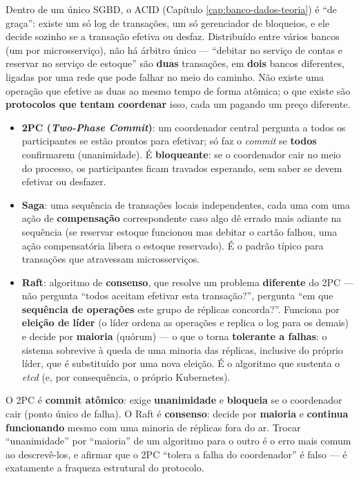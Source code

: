 \begin{conceito}
Dentro de um único SGBD, o ACID (Capítulo \ref{cap:banco-dados-teoria}) é
“de graça”: existe um só log de transações, um só gerenciador de
bloqueios, e ele decide sozinho se a transação efetiva ou desfaz.
Distribuído entre vários bancos (um por microsserviço), não há árbitro
único --- “debitar no serviço de contas e reservar no serviço de estoque”
são \textbf{duas} transações, em \textbf{dois} bancos diferentes, ligadas
por uma rede que pode falhar no meio do caminho. Não existe uma operação
que efetive as duas ao mesmo tempo de forma atômica; o que existe são
\textbf{protocolos que tentam coordenar} isso, cada um pagando um preço
diferente.

\begin{itemize}
\item \textbf{2PC (\textit{Two-Phase Commit})}: um coordenador central
pergunta a todos os participantes se estão prontos para efetivar; só faz o
\textit{commit} se \textbf{todos} confirmarem (unanimidade). É
\textbf{bloqueante}: se o coordenador cair no meio do processo, os
participantes ficam travados esperando, sem saber se devem efetivar ou
desfazer.
\item \textbf{Saga}: uma sequência de transações locais independentes, cada
uma com uma ação de \textbf{compensação} correspondente caso algo dê
errado mais adiante na sequência (se reservar estoque funcionou mas debitar
o cartão falhou, uma ação compensatória libera o estoque reservado). É o
padrão típico para transações que atravessam microsserviços.
\item \textbf{Raft}: algoritmo de \textbf{consenso}, que resolve um
problema \textbf{diferente} do 2PC --- não pergunta “todos aceitam
efetivar esta transação?”, pergunta “em que \textbf{sequência de
operações} este grupo de réplicas concorda?”. Funciona por
\textbf{eleição de líder} (o líder ordena as operações e replica o log
para os demais) e decide por \textbf{maioria} (quórum) --- o que o torna
\textbf{tolerante a falhas}: o sistema sobrevive à queda de uma minoria
das réplicas, inclusive do próprio líder, que é substituído por uma nova
eleição. É o algoritmo que sustenta o \textit{etcd} (e, por consequência,
o próprio Kubernetes).
\end{itemize}
\end{conceito}

\begin{cuidado}
O 2PC é \textbf{commit atômico}: exige \textbf{unanimidade} e
\textbf{bloqueia} se o coordenador cair (ponto único de falha). O Raft é
\textbf{consenso}: decide por \textbf{maioria} e \textbf{continua
funcionando} mesmo com uma minoria de réplicas fora do ar. Trocar
“unanimidade” por “maioria” de um algoritmo para o outro é o erro mais
comum ao descrevê-los, e afirmar que o 2PC “tolera a falha do coordenador”
é falso --- é exatamente a fraqueza estrutural do protocolo.
\end{cuidado}

